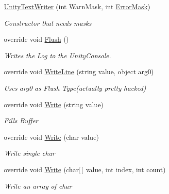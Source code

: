 \begin{DoxyCompactItemize}
\item 
\mbox{\hyperlink{class_a_d_l_1_1_unity_1_1_unity_text_writer_ad037515e513a7f4c94d4cb2caf58b422}{Unity\+Text\+Writer}} (int Warn\+Mask, int \mbox{\hyperlink{class_a_d_l_1_1_unity_1_1_unity_text_writer_a150a993a52f0ede7a6f8ba04728b4bfe}{Error\+Mask}})
\begin{DoxyCompactList}\small\item\em Constructor that needs masks \end{DoxyCompactList}\item 
override void \mbox{\hyperlink{class_a_d_l_1_1_unity_1_1_unity_text_writer_ad62666e8a12f473f34780dbfdbc71975}{Flush}} ()
\begin{DoxyCompactList}\small\item\em Writes the Log to the Unity\+Console. \end{DoxyCompactList}\item 
override void \mbox{\hyperlink{class_a_d_l_1_1_unity_1_1_unity_text_writer_a12b1bcfd083d9e771330d95d1857e569}{Write\+Line}} (string value, object arg0)
\begin{DoxyCompactList}\small\item\em Uses arg0 as Flush Type(actually pretty hacked) \end{DoxyCompactList}\item 
override void \mbox{\hyperlink{class_a_d_l_1_1_unity_1_1_unity_text_writer_ad951026a7b9df781b94fbc9a5274ac51}{Write}} (string value)
\begin{DoxyCompactList}\small\item\em Fills Buffer \end{DoxyCompactList}\item 
override void \mbox{\hyperlink{class_a_d_l_1_1_unity_1_1_unity_text_writer_a9636a16d9e1f9b04d76d4087688bac3a}{Write}} (char value)
\begin{DoxyCompactList}\small\item\em Write single char \end{DoxyCompactList}\item 
override void \mbox{\hyperlink{class_a_d_l_1_1_unity_1_1_unity_text_writer_ace3ec2f343589f5a1d92145f5f61fb47}{Write}} (char\mbox{[}$\,$\mbox{]} value, int index, int count)
\begin{DoxyCompactList}\small\item\em Write an array of char \end{DoxyCompactList}\end{DoxyCompactItemize}
